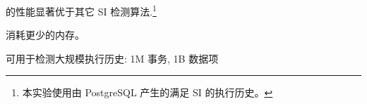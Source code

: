 % 		


\begin{frame}{}
	\centerline{\polysi{} 的性能显著优于其它 SI 检测算法.\footnote{
		本实验使用由 PostgreSQL 产生的满足 SI 的执行历史。
	}}

\end{frame}

\begin{frame}{}
	\centerline{\polysi{} 消耗更少的内存。}
\end{frame}

\begin{frame}{}
	\begin{center}
		\polysi{} 可用于检测大规模执行历史: 1M 事务, 1B 数据项

		\vspace{0.30cm}
		\vspace{0.30cm}
	\end{center}
\end{frame}

